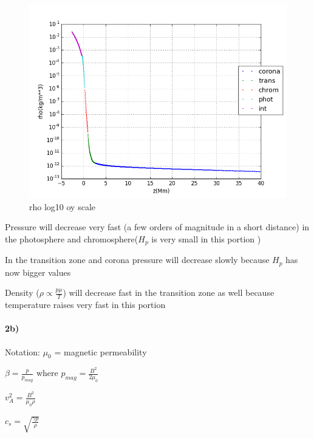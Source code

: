 \documentclass[10pt]{book}
\begin{document}
\begin{figure}[H]
 \centering
 \includegraphics[scale=0.5]{fromFileLogScale2.png}
 \caption{rho log10 oy scale}
\end{figure}

Pressure will decrease very fast (a few orders of magnitude in a short distance) in the photosphere and chromosphere($H_p$ is very small in this portion )

In the transition zone and corona  pressure will decrease slowly because $H_p$ has now bigger values 

Density ($ \rho \propto \frac{p \mu}{T}$) will decrease fast in the transition zone as well because temperature raises very fast in this portion 

\paragraph{2b)}
Notation: $\mu_0$ = magnetic permeability 

$\beta = \frac{p}{p_{mag}}$ where $p_{mag} = \frac{B^2}{2 \mu_0}$

$v_A^2 = \frac{B ^2 }{ \mu_0 \rho} $

$c_s = \sqrt{\frac{\gamma p}{ \rho}} $
\end{document}
